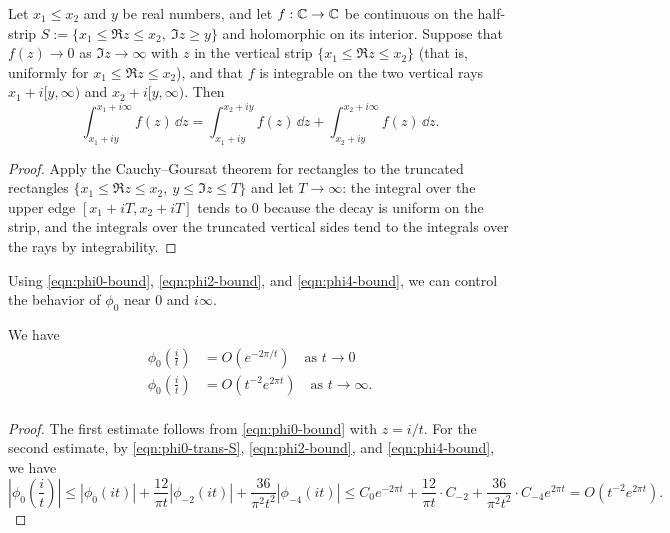 \begin{lemma}\label{lem:CG-unbounded}\leanok\mathlibok
Let $x_1 \leq x_2$ and $y$ be real numbers, and let $f : \mathbb{C} \to \mathbb{C}$ be continuous on the half-strip $S := \{x_1 \leq \Re z \leq x_2,\ \Im z \geq y\}$ and holomorphic on its interior. Suppose that $f(z) \to 0$ as $\Im z \to \infty$ with $z$ in the vertical strip $\{x_1 \leq \Re z \leq x_2\}$ (that is, uniformly for $x_1 \leq \Re z \leq x_2$), and that $f$ is integrable on the two vertical rays $x_1 + i[y, \infty)$ and $x_2 + i[y, \infty)$. Then
\[
    \int_{x_1 + iy}^{x_1 + i\infty} f(z)\, \dd z
    = \int_{x_1 + iy}^{x_2 + iy} f(z)\, \dd z + \int_{x_2 + iy}^{x_2 + i\infty} f(z)\, \dd z.
\]
\end{lemma}
\begin{proof}\leanok
Apply the Cauchy--Goursat theorem for rectangles to the truncated rectangles $\{x_1 \leq \Re z \leq x_2,\ y \leq \Im z \leq T\}$ and let $T \to \infty$: the integral over the upper edge $[x_1 + iT, x_2 + iT]$ tends to $0$ because the decay is uniform on the strip, and the integrals over the truncated vertical sides tend to the integrals over the rays by integrability.
\end{proof}

Using \eqref{eqn:phi0-bound}, \eqref{eqn:phi2-bound}, and \eqref{eqn:phi4-bound}, we can control the behavior of $\phi_0$ near $0$ and $i\infty$.

\begin{corollary}\label{cor:phi0-near-0-infty}
We have
\begin{align}
    \phi_0\left(\frac{i}{t}\right) &= O(e^{-2 \pi / t}) \quad \text{as } t \to 0 \label{eqn:phi0-near-0} \\
    \phi_0\left(\frac{i}{t}\right) &= O(t^{-2}e^{2 \pi t}) \quad \text{as } t \to \infty. \label{eqn:phi0-near-infty} \\
\end{align}
\end{corollary}
\begin{proof}
The first estimate follows from \eqref{eqn:phi0-bound} with $z = i/t$.
For the second estimate, by \eqref{eqn:phi0-trans-S}, \eqref{eqn:phi2-bound}, and \eqref{eqn:phi4-bound}, we have
\begin{equation}
    \left|\phi_0\left(\frac{i}{t}\right)\right| \le |\phi_0(it)| + \frac{12}{\pi t} |\phi_{-2}(it)| + \frac{36}{\pi^2 t^2} |\phi_{-4}(it)|
    \le C_0 e^{-2 \pi t} + \frac{12}{\pi t} \cdot C_{-2} + \frac{36}{\pi^2 t^2} \cdot C_{-4} e^{2 \pi t} = O(t^{-2}e^{2 \pi t}).
\end{equation}
\end{proof}

